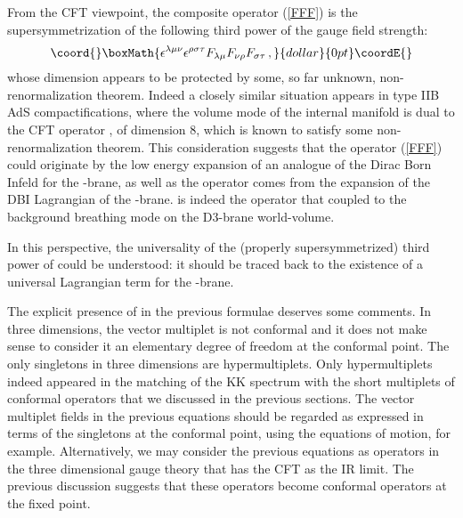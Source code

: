 \documentclass[a4paper,12pt]{article}
\begin{document}
From the CFT viewpoint, the composite operator (\ref{FFF}) is the
\coordHE{} supersymmetrization of the following third power of
the gauge field strength:
$$\coord{}\boxMath{
  \epsilon^{\lambda\mu\nu}\epsilon^{\rho\sigma\tau}
  F_{\lambda\mu}F_{\nu\rho}F_{\sigma\tau}\,,
}{dollar}{0pt}\coordE{}$$
whose dimension appears to be protected by some, so far unknown,
non-renormalization theorem.
Indeed a closely similar situation appears in type IIB AdS\coordHE{}
compactifications, where the volume mode of the internal manifold
is dual to the CFT operator \coordHE{}, of dimension 8, which is
known to satisfy some non-renormalization theorem.
This consideration suggests that the operator (\ref{FFF}) could
originate by the low energy expansion of an analogue of the Dirac Born
Infeld for the \coordHE{}-brane, as well as the operator \coordHE{} comes from the
\coordHE{} expansion of the DBI Lagrangian of the \coordHE{}-brane.
\coordHE{} is indeed the operator that coupled to the background breathing
mode on the D3-brane world-volume.
\par
In this perspective, the universality of the (properly supersymmetrized)
third power of \coordHE{} could be understood: it should be traced
back to the existence of a universal Lagrangian term for the \coordHE{}-brane.
\par
The explicit presence of \coordHE{} in the previous formulae deserves
some comments.
In three dimensions, the vector multiplet is not conformal and it does
not make sense to consider it an elementary degree of freedom at the
conformal point. The only singletons in three dimensions are
hypermultiplets. Only hypermultiplets indeed appeared in the matching
of the KK spectrum with the short multiplets of conformal operators
that we discussed in the previous sections. The vector multiplet fields
in the previous equations should be regarded as expressed in terms
of the singletons at the conformal point, using the equations
of motion, for example. Alternatively, we may consider the previous
equations as operators in the three dimensional gauge theory that has
the CFT as the IR limit. The previous discussion suggests that these
operators become conformal operators at the fixed point.
%
%
\end{document}
